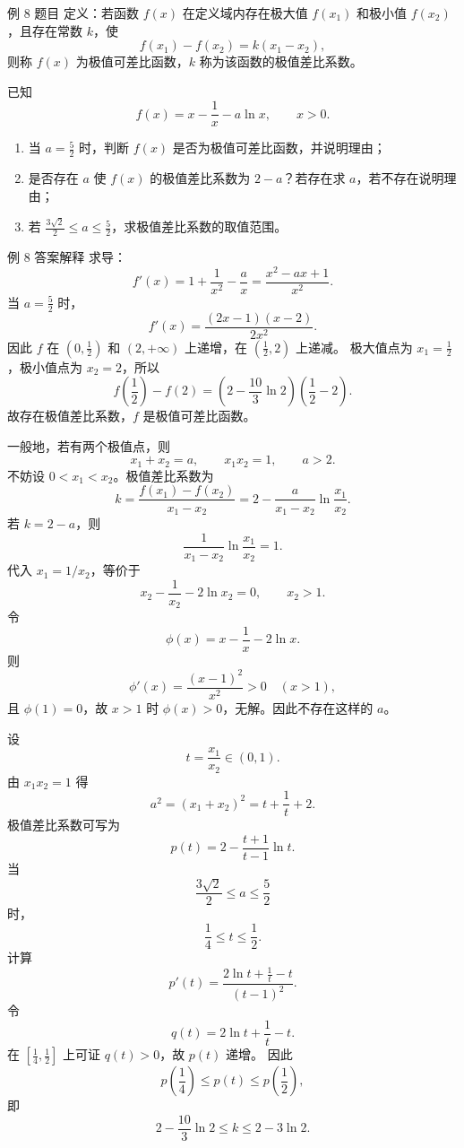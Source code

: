 ﻿\documentclass[aspectratio=169,10pt]{ctexbeamer}
\begin{document}
\begin{frame}{例 8 题目}
\small
定义：若函数 $f(x)$ 在定义域内存在极大值 $f(x_1)$ 和极小值 $f(x_2)$，且存在常数 $k$，使
\[
f(x_1)-f(x_2)=k(x_1-x_2),
\]
则称 $f(x)$ 为极值可差比函数，$k$ 称为该函数的极值差比系数。

已知
\[
f(x)=x-\frac1x-a\ln x,\qquad x>0.
\]
\begin{enumerate}
  \item 当 $a=\frac52$ 时，判断 $f(x)$ 是否为极值可差比函数，并说明理由；
  \item 是否存在 $a$ 使 $f(x)$ 的极值差比系数为 $2-a$？若存在求 $a$，若不存在说明理由；
  \item 若 $\frac{3\sqrt2}{2}\le a\le\frac52$，求极值差比系数的取值范围。
\end{enumerate}
\end{frame}

\begin{frame}[allowframebreaks]{例 8 答案解释}
\small
求导：
\[
f'(x)=1+\frac1{x^2}-\frac ax=\frac{x^2-ax+1}{x^2}.
\]
当 $a=\frac52$ 时，
\[
f'(x)=\frac{(2x-1)(x-2)}{2x^2}.
\]
因此 $f$ 在 $(0,\frac12)$ 和 $(2,+\infty)$ 上递增，在 $(\frac12,2)$ 上递减。
极大值点为 $x_1=\frac12$，极小值点为 $x_2=2$，所以
\[
f\left(\frac12\right)-f(2)
=\left(2-\frac{10}3\ln2\right)\left(\frac12-2\right).
\]
故存在极值差比系数，$f$ 是极值可差比函数。

\framebreak

一般地，若有两个极值点，则
\[
x_1+x_2=a,\qquad x_1x_2=1,\qquad a>2.
\]
不妨设 $0<x_1<x_2$。极值差比系数为
\[
k=\frac{f(x_1)-f(x_2)}{x_1-x_2}
=2-\frac{a}{x_1-x_2}\ln\frac{x_1}{x_2}.
\]
若 $k=2-a$，则
\[
\frac1{x_1-x_2}\ln\frac{x_1}{x_2}=1.
\]
代入 $x_1=1/x_2$，等价于
\[
x_2-\frac1{x_2}-2\ln x_2=0,\qquad x_2>1.
\]
令
\[
\phi(x)=x-\frac1x-2\ln x.
\]
则
\[
\phi'(x)=\frac{(x-1)^2}{x^2}>0\quad(x>1),
\]
且 $\phi(1)=0$，故 $x>1$ 时 $\phi(x)>0$，无解。因此不存在这样的 $a$。

\framebreak

设
\[
t=\frac{x_1}{x_2}\in(0,1).
\]
由 $x_1x_2=1$ 得
\[
a^2=(x_1+x_2)^2=t+\frac1t+2.
\]
极值差比系数可写为
\[
p(t)=2-\frac{t+1}{t-1}\ln t.
\]
当
\[
\frac{3\sqrt2}{2}\le a\le\frac52
\]
时，
\[
\frac14\le t\le\frac12.
\]
计算
\[
p'(t)=\frac{2\ln t+\frac1t-t}{(t-1)^2}.
\]
令
\[
q(t)=2\ln t+\frac1t-t.
\]
在 $[\frac14,\frac12]$ 上可证 $q(t)>0$，故 $p(t)$ 递增。
因此
\[
p\left(\frac14\right)\le p(t)\le p\left(\frac12\right),
\]
即
\[
\boxed{2-\frac{10}{3}\ln2\le k\le 2-3\ln2}.
\]
\end{frame}
\end{document}
